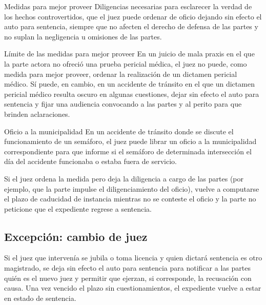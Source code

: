 \documentclass[12pt,oneside]{book}
\begin{document}
\begin{definition}{Medidas para mejor proveer}
Diligencias necesarias para esclarecer la verdad de los hechos controvertidos, que el juez puede ordenar de oficio dejando sin efecto el auto para sentencia, siempre que no afecten el derecho de defensa de las partes y no suplan la negligencia u omisiones de las partes.
\end{definition}

\begin{example}{Límite de las medidas para mejor proveer}
En un juicio de mala praxis en el que la parte actora no ofreció una prueba pericial médica, el juez no puede, como medida para mejor proveer, ordenar la realización de un dictamen pericial médico. Sí puede, en cambio, en un accidente de tránsito en el que un dictamen pericial médico resulta oscuro en algunas cuestiones, dejar sin efecto el auto para sentencia y fijar una audiencia convocando a las partes y al perito para que brinden aclaraciones.
\end{example}

\begin{example}{Oficio a la municipalidad}
En un accidente de tránsito donde se discute el funcionamiento de un semáforo, el juez puede librar un oficio a la municipalidad correspondiente para que informe si el semáforo de determinada intersección el día del accidente funcionaba o estaba fuera de servicio.
\end{example}

\begin{important}
Si el juez ordena la medida pero deja la diligencia a cargo de las partes (por ejemplo, que la parte impulse el diligenciamiento del oficio), vuelve a computarse el plazo de caducidad de instancia mientras no se conteste el oficio y la parte no peticione que el expediente regrese a sentencia.
\end{important}

\subsection{Excepción: cambio de juez}

Si el juez que intervenía se jubila o toma licencia y quien dictará sentencia es otro magistrado, se deja sin efecto el auto para sentencia para notificar a las partes quién es el nuevo juez y permitir que ejerzan, si corresponde, la recusación con causa. Una vez vencido el plazo sin cuestionamientos, el expediente vuelve a estar en estado de sentencia.
\end{document}
